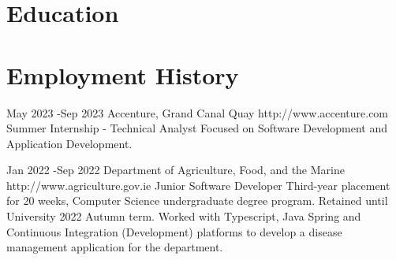\documentclass[10pt]{article} %
\begin{document}

\section{Education}





\section{Employment History}

\job
{May 2023 -}{Sep 2023}
{Accenture, Grand Canal Quay}
{http://www.accenture.com}
{Summer Internship - Technical Analyst}
{Focused on Software Development and Application Development.}


\job
{Jan 2022 -}{Sep 2022}
{Department of Agriculture, Food, and the Marine}
{http://www.agriculture.gov.ie}
{Junior Software Developer}
{Third-year placement for 20 weeks, Computer Science undergraduate degree program. Retained until University 2022 Autumn term. Worked with Typescript, Java Spring and Continuous Integration (Development) platforms to develop a disease management application for the department.}
\end{document}
